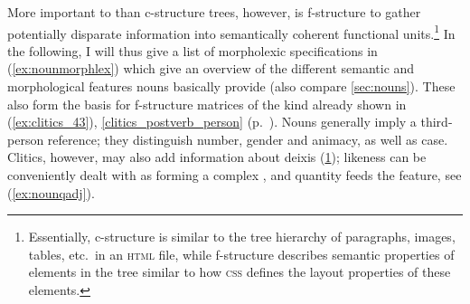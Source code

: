 More important to \Lfg{} than c-structure trees, however, is f-structure to
gather potentially disparate information into semantically coherent functional
units.\footnote{Essentially, c-structure is similar to the tree hierarchy of
paragraphs, images, tables, etc.\ in an \textsc{html} file, while f-structure
describes semantic properties of elements in the tree similar to how
\textsc{css} defines the layout properties of these elements.} In the
following, I will thus give a list of morpholexic specifications in
(\ref{ex:nounmorphlex}) which give an overview of the different semantic and
morphological features nouns basically provide (also compare
\autoref{sec:nouns}). These also form the basis for f-structure matrices of the
kind already shown in (\ref{ex:clitics_43}),
\autoref{clitics_postverb_person} (p.~\pageref{ex:clitics_43}). Nouns generally
imply a third-person reference; they distinguish number, gender and animacy, as
well as case. Clitics, however, may also add information about deixis
(\ref{ex:deixisfeat}); likeness can be conveniently dealt with as forming a
complex \Pred{}, and quantity feeds the \Quant{} feature, see (\ref{ex:nounqadj}).

\begin{figure}
\begin{morphlex}
\pex\label{ex:nounmorphlex}%
\a{}

\a\label{ex:deixisfeat}
\xe
\end{morphlex}
\end{figure}

